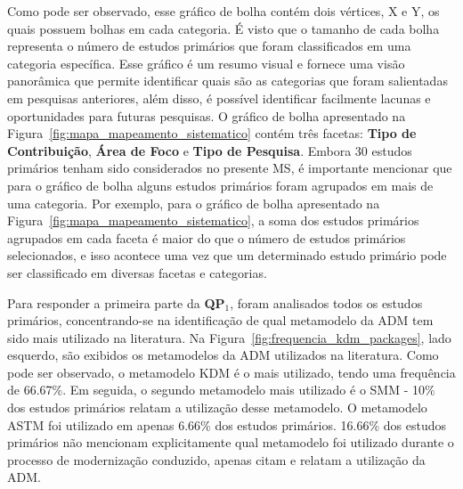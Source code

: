 Como pode ser observado, esse gráfico de bolha contém dois vértices, X e Y, os quais possuem bolhas em cada categoria. É visto que o tamanho de cada bolha representa o número de estudos primários que foram classificados em uma categoria específica. Esse gráfico é um resumo visual e fornece uma visão panorâmica que permite identificar quais são as categorias que foram salientadas em pesquisas anteriores, além disso, é possível identificar facilmente lacunas e oportunidades para futuras pesquisas. O gráfico de bolha apresentado na Figura~\ref{fig:mapa_mapeamento_sistematico} contém três facetas: \textbf{Tipo de Contribuição}, \textbf{Área de Foco} e \textbf{Tipo de Pesquisa}. Embora 30 estudos primários tenham sido considerados no presente MS, é importante mencionar que para o gráfico de bolha alguns estudos primários foram agrupados em mais de uma categoria. Por exemplo, para o gráfico de bolha apresentado na Figura~\ref{fig:mapa_mapeamento_sistematico}, a soma dos estudos primários agrupados em cada faceta é maior do que o número de estudos primários selecionados, e isso acontece uma vez que um determinado estudo primário pode ser classificado em diversas facetas e categorias.

Para responder a primeira parte da \textbf{QP$_1$}, foram analisados todos os estudos primários, concentrando-se na identificação de qual metamodelo da ADM tem sido mais utilizado na literatura. Na Figura~\ref{fig:frequencia_kdm_packages}, lado esquerdo, são exibidos os metamodelos da ADM utilizados na literatura. Como pode ser observado, o metamodelo KDM é o mais utilizado, tendo uma frequência de 66.67\%. Em seguida, o segundo metamodelo mais utilizado é o SMM - 10\% dos estudos primários relatam a utilização desse metamodelo. O metamodelo ASTM foi utilizado em apenas 6.66\% dos estudos primários. 16.66\% dos estudos primários não mencionam explicitamente qual metamodelo foi utilizado durante o processo de modernização conduzido, apenas citam e relatam a utilização da ADM.

